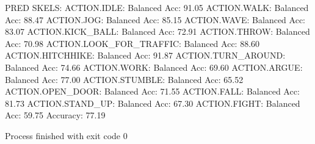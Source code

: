 PRED SKELS:
ACTION.IDLE: Balanced Acc: 91.05%
ACTION.WALK: Balanced Acc: 88.47%
ACTION.JOG: Balanced Acc: 85.15%
ACTION.WAVE: Balanced Acc: 83.07%
ACTION.KICK_BALL: Balanced Acc: 72.91%
ACTION.THROW: Balanced Acc: 70.98%
ACTION.LOOK_FOR_TRAFFIC: Balanced Acc: 88.60%
ACTION.HITCHHIKE: Balanced Acc: 91.87%
ACTION.TURN_AROUND: Balanced Acc: 74.66%
ACTION.WORK: Balanced Acc: 69.60%
ACTION.ARGUE: Balanced Acc: 77.00%
ACTION.STUMBLE: Balanced Acc: 65.52%
ACTION.OPEN_DOOR: Balanced Acc: 71.55%
ACTION.FALL: Balanced Acc: 81.73%
ACTION.STAND_UP: Balanced Acc: 67.30%
ACTION.FIGHT: Balanced Acc: 59.75%
Accuracy: 77.19%

Process finished with exit code 0

